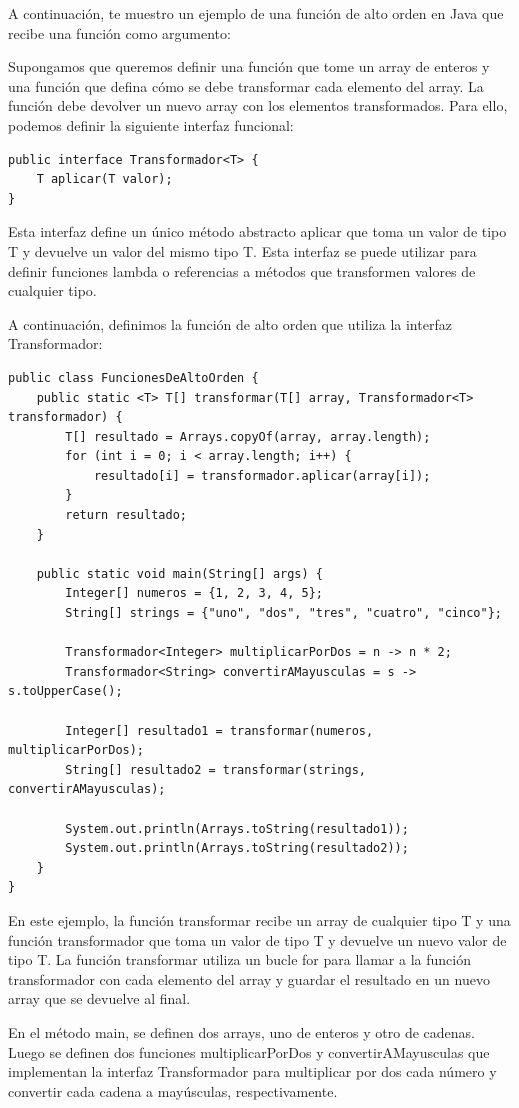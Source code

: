\documentclass[executivepaper]{article}
\begin{document}
A continuación, te muestro un ejemplo de una función de alto orden en Java que recibe una función como argumento:

Supongamos que queremos definir una función que tome un array de enteros y una función que defina cómo se debe transformar cada elemento del array. La función debe devolver un nuevo array con los elementos transformados.
Para ello, podemos definir la siguiente interfaz funcional:
\begin{lstlisting}
public interface Transformador<T> {
    T aplicar(T valor);
}    
\end{lstlisting}
Esta interfaz define un único método abstracto aplicar que toma un valor de tipo T y devuelve un valor del mismo tipo T. Esta interfaz se puede utilizar para definir funciones lambda o referencias a métodos que transformen valores de cualquier tipo.

A continuación, definimos la función de alto orden que utiliza la interfaz Transformador:
\begin{lstlisting}
public class FuncionesDeAltoOrden {
    public static <T> T[] transformar(T[] array, Transformador<T> transformador) {
        T[] resultado = Arrays.copyOf(array, array.length);
        for (int i = 0; i < array.length; i++) {
            resultado[i] = transformador.aplicar(array[i]);
        }
        return resultado;
    }

    public static void main(String[] args) {
        Integer[] numeros = {1, 2, 3, 4, 5};
        String[] strings = {"uno", "dos", "tres", "cuatro", "cinco"};

        Transformador<Integer> multiplicarPorDos = n -> n * 2;
        Transformador<String> convertirAMayusculas = s -> s.toUpperCase();

        Integer[] resultado1 = transformar(numeros, multiplicarPorDos);
        String[] resultado2 = transformar(strings, convertirAMayusculas);

        System.out.println(Arrays.toString(resultado1));
        System.out.println(Arrays.toString(resultado2));
    }
}
\end{lstlisting}
En este ejemplo, la función transformar recibe un array de cualquier tipo T y una función transformador que toma un valor de tipo T y devuelve un nuevo valor de tipo T. La función transformar utiliza un bucle for para llamar a la función transformador con cada elemento del array y guardar el resultado en un nuevo array que se devuelve al final.

En el método main, se definen dos arrays, uno de enteros y otro de cadenas. Luego se definen dos funciones multiplicarPorDos y convertirAMayusculas que implementan la interfaz Transformador para multiplicar por dos cada número y convertir cada cadena a mayúsculas, respectivamente.
\end{document}
